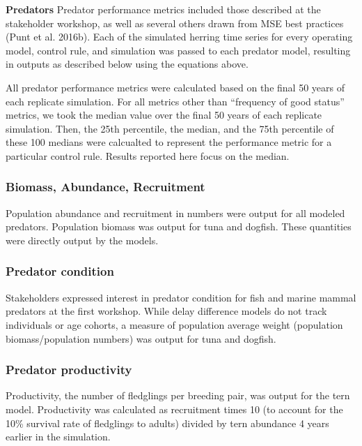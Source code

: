 \documentclass[]{article}
\begin{document}
\textbf{Predators} Predator performance metrics included those described
at the stakeholder workshop, as well as several others drawn from MSE
best practices (Punt et al. 2016b). Each of the simulated herring time
series for every operating model, control rule, and simulation was
passed to each predator model, resulting in outputs as described below
using the equations above.

All predator performance metrics were calculated based on the final 50
years of each replicate simulation. For all metrics other than
``frequency of good status'' metrics, we took the median value over the
final 50 years of each replicate simulation. Then, the 25th percentile,
the median, and the 75th percentile of these 100 medians were calcualted
to represent the performance metric for a particular control rule.
Results reported here focus on the median.

\subsubsection{Biomass, Abundance,
Recruitment}\label{biomass-abundance-recruitment}

Population abundance and recruitment in numbers were output for all
modeled predators. Population biomass was output for tuna and dogfish.
These quantities were directly output by the models.

\subsubsection{Predator condition}\label{predator-condition}

Stakeholders expressed interest in predator condition for fish and
marine mammal predators at the first workshop. While delay difference
models do not track individuals or age cohorts, a measure of population
average weight (population biomass/population numbers) was output for
tuna and dogfish.

\subsubsection{Predator productivity}\label{predator-productivity}

Productivity, the number of fledglings per breeding pair, was output for
the tern model. Productivity was calculated as recruitment times 10 (to
account for the 10\% survival rate of fledglings to adults) divided by
tern abundance 4 years earlier in the simulation.
\end{document}
